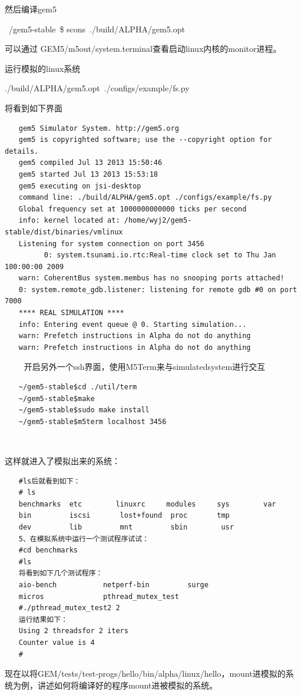 然后编译gem5

~/gem5-stable \$ scons ./build/ALPHA/gem5.opt

可以通过 GEM5/m5out/system.terminal查看启动linux内核的monitor进程。

运行模拟的linux系统

./build/ALPHA/gem5.opt ./configs/example/fs.py  

将看到如下界面
\begin{verbatim}
　　gem5 Simulator System. http://gem5.org
　　gem5 is copyrighted software; use the --copyright option for details.
　　gem5 compiled Jul 13 2013 15:50:46
　　gem5 started Jul 13 2013 15:53:18
　　gem5 executing on jsi-desktop
　　command line: ./build/ALPHA/gem5.opt ./configs/example/fs.py
　　Global frequency set at 1000000000000 ticks per second
　　info: kernel located at: /home/wyj2/gem5-stable/dist/binaries/vmlinux
　　Listening for system connection on port 3456
　　      0: system.tsunami.io.rtc:Real-time clock set to Thu Jan  100:00:00 2009
　　warn: CoherentBus system.membus has no snooping ports attached!
　　0: system.remote_gdb.listener: listening for remote gdb #0 on port 7000
　　**** REAL SIMULATION ****
　　info: Entering event queue @ 0. Starting simulation...
　　warn: Prefetch instructions in Alpha do not do anything
　　warn: Prefetch instructions in Alpha do not do anything
\end{verbatim}
　　
开启另外一个ssh界面，使用M5Term来与simulatedsystem进行交互
\begin{verbatim}
　　~/gem5-stable$cd ./util/term  
　　~/gem5-stable$make  
　　~/gem5-stable$sudo make install  
　　~/gem5-stable$m5term localhost 3456 
\end{verbatim}　　

这样就进入了模拟出来的系统：
\begin{verbatim}
　　#ls后就看到如下：
　　# ls
　　benchmarks  etc        linuxrc     modules     sys        var
　　bin         iscsi       lost+found  proc       tmp
　　dev         lib         mnt         sbin        usr
　　5、在模拟系统中运行一个测试程序试试：
　　#cd benchmarks
　　#ls
　　将看到如下几个测试程序：
　　aio-bench           netperf-bin         surge
　　micros              pthread_mutex_test
　　#./pthread_mutex_test2 2
　　运行结果如下：
　　Using 2 threadsfor 2 iters
　　Counter value is 4
　　#
\end{verbatim}

现在以将GEM/tests/test-progs/hello/bin/alpha/linux/hello，mount进模拟的系统为例，讲述如何将编译好的程序mount进被模拟的系统。

